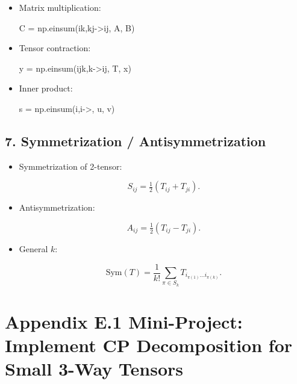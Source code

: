 \documentclass[
  letterpaper,
  DIV=11,
  numbers=noendperiod]{scrreprt}
\newenvironment{Shaded}{\begin{snugshade}}{\end{snugshade}}
\newcommand{\NormalTok}[1]{\textcolor[rgb]{0.00,0.23,0.31}{#1}}
\newcommand{\OperatorTok}[1]{\textcolor[rgb]{0.37,0.37,0.37}{#1}}
\newcommand{\StringTok}[1]{\textcolor[rgb]{0.13,0.47,0.30}{#1}}
\begin{document}
\begin{itemize}
\item
  Matrix multiplication:

\begin{Shaded}
\begin{Highlighting}[]
\NormalTok{C }\OperatorTok{=}\NormalTok{ np.einsum(}\StringTok{\textquotesingle{}ik,kj{-}\textgreater{}ij\textquotesingle{}}\NormalTok{, A, B)}
\end{Highlighting}
\end{Shaded}
\item
  Tensor contraction:

\begin{Shaded}
\begin{Highlighting}[]
\NormalTok{y }\OperatorTok{=}\NormalTok{ np.einsum(}\StringTok{\textquotesingle{}ijk,k{-}\textgreater{}ij\textquotesingle{}}\NormalTok{, T, x)}
\end{Highlighting}
\end{Shaded}
\item
  Inner product:

\begin{Shaded}
\begin{Highlighting}[]
\NormalTok{s }\OperatorTok{=}\NormalTok{ np.einsum(}\StringTok{\textquotesingle{}i,i{-}\textgreater{}\textquotesingle{}}\NormalTok{, u, v)}
\end{Highlighting}
\end{Shaded}
\end{itemize}

\subsection{7. Symmetrization /
Antisymmetrization}\label{symmetrization-antisymmetrization}

\begin{itemize}
\item
  Symmetrization of 2-tensor:

  \[
  S_{ij} = \tfrac{1}{2}(T_{ij} + T_{ji}).
  \]
\item
  Antisymmetrization:

  \[
  A_{ij} = \tfrac{1}{2}(T_{ij} - T_{ji}).
  \]
\item
  General \(k\):

  \[
  \text{Sym}(T) = \frac{1}{k!} \sum_{\pi \in S_k} T_{i_{\pi(1)} \dots i_{\pi(k)}}.
  \]
\end{itemize}

\section{Appendix E.1 Mini-Project: Implement CP Decomposition for Small
3-Way
Tensors}\label{appendix-e.1-mini-project-implement-cp-decomposition-for-small-3-way-tensors}
\end{document}
